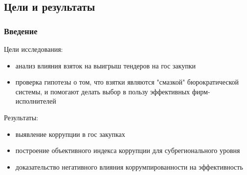 \subsection{Цели и результаты}

\begin{frame}[t]
\setlength{\parindent}{3pt}

\frametitle{Введение}
Цели исследования:\\ 

\begin{itemize}
\item анализ влияния взяток на выигрыш 
тендеров на гос закупки

\item проверка гипотезы о том, 
что взятки являются "смазкой" бюрократической системы, и помогают делать выбор в пользу
эффективных фирм-исполнителей
\end{itemize}

\vspace{5mm}

Результаты:
\begin{itemize}

\item выявление коррупции в гос закупках

\item построение объективного индекса
коррупции для субрегионального уровня

\item доказательство негативного влияния коррумпированности на
эффективность

\end{itemize}

\end{frame}